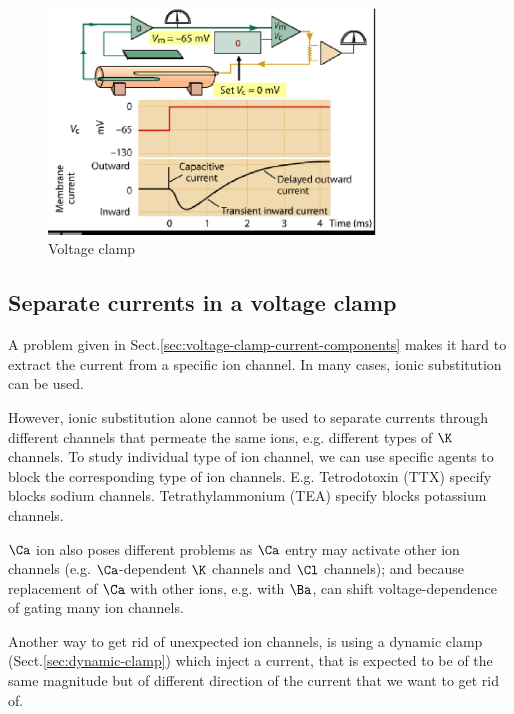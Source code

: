 


\begin{figure}[htb]
  \centerline{\includegraphics[height=6cm]{./images/voltage_clamp_ex1.eps}}
  \caption{Voltage clamp}\label{fig:voltage_clamp_ex}
\end{figure}



\subsection{Separate currents in a voltage clamp}
\label{sec:voltage-clamp-separate-current-components}

A problem given in Sect.\ref{sec:voltage-clamp-current-components} makes it hard
to extract the current from a specific ion channel. In many cases, ionic
substitution can be used.

However, ionic substitution alone cannot be used to separate currents through
different channels that permeate the same ions, e.g. different types of $\K$
channels. To study individual type of ion channel, we can use specific agents to
block the corresponding type of ion channels. E.g. Tetrodotoxin (TTX) specify
blocks sodium channels. Tetrathylammonium (TEA) specify blocks potassium channels.

$\Ca$ ion also poses different problems as $\Ca$ entry may activate other ion
channels (e.g. $\Ca$-dependent $\K$ channels and $\Cl$ channels); and because
replacement of $\Ca$ with other ions, e.g. with $\Ba$, can shift
voltage-dependence of gating many ion channels.

Another way to get rid of unexpected ion channels, is using a dynamic clamp
(Sect.\ref{sec:dynamic-clamp}) which inject a current, that is expected
to be of the same magnitude but of different direction of the current
that we want to get rid of.





